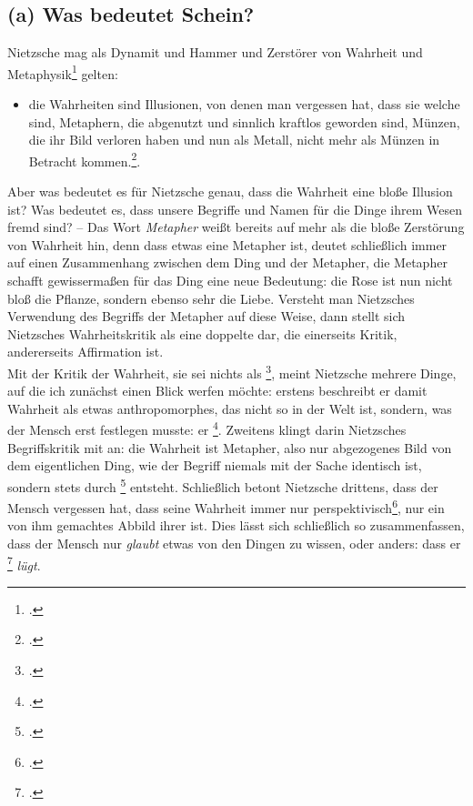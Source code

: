 \documentclass[12pt, a4paper, openany]{report}
\begin{document}
\subsection{(a) Was bedeutet Schein?}
Nietzsche mag als Dynamit und Hammer und Zerstörer von Wahrheit und Metaphysik\footcite[Vgl.][59]{stephan_nietzscheanismus_2019} gelten: 
\begin{itemize}
    \item[] die Wahrheiten sind Illusionen, von denen man vergessen hat, dass sie welche sind, Metaphern, die abgenutzt und sinnlich kraftlos geworden sind, Münzen, die ihr Bild verloren haben und nun als Metall, nicht mehr als Münzen in Betracht kommen.\footcite[][881]{nietzsche_geburt_1999}. 
\end{itemize}
Aber was bedeutet es für Nietzsche genau, dass die Wahrheit eine bloße Illusion ist? 
Was bedeutet es, dass unsere Begriffe und Namen für die Dinge ihrem Wesen fremd sind?
-- Das Wort \emph{Metapher} weißt bereits auf mehr als die bloße Zerstörung von Wahrheit hin, denn dass etwas eine Metapher ist, deutet schließlich immer auf einen Zusammenhang zwischen dem Ding und der Metapher, die Metapher schafft gewissermaßen für das Ding eine neue Bedeutung: 
die Rose ist nun nicht bloß die Pflanze, sondern ebenso sehr die Liebe.
Versteht man Nietzsches Verwendung des Begriffs der Metapher auf diese Weise, dann stellt sich Nietzsches Wahrheitskritik als eine doppelte dar, die einerseits Kritik, andererseits Affirmation ist.\\

Mit der Kritik der Wahrheit, sie sei nichts als \footcite[][880]{nietzsche_geburt_1999}, meint Nietzsche mehrere Dinge, auf die ich zunächst einen Blick werfen möchte: 
erstens beschreibt er damit Wahrheit als etwas anthropomorphes, das nicht so in der Welt ist, sondern, was der Mensch erst festlegen musste: er \footcite[][877]{nietzsche_geburt_1999}.
Zweitens klingt darin Nietzsches Begriffskritik mit an:
die Wahrheit ist Metapher, also nur abgezogenes Bild von dem eigentlichen Ding, wie der Begriff niemals mit der Sache identisch ist, sondern stets durch \footcite[][880]{nietzsche_geburt_1999} entsteht.
Schließlich betont Nietzsche drittens, dass der Mensch vergessen hat, dass seine Wahrheit immer nur perspektivisch\footcite[Vgl.][364]{nietzsche_jenseits_2014}, nur ein von ihm gemachtes Abbild ihrer ist. 
Dies lässt sich schließlich so zusammenfassen, dass der Mensch nur \emph{glaubt} etwas von den Dingen zu wissen, oder anders: dass er \footcite[][881]{nietzsche_geburt_1999} \emph{lügt}.\\
\end{document}
